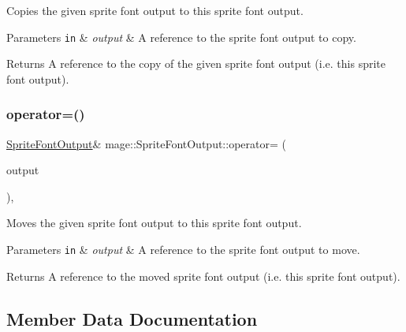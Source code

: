 Copies the given sprite font output to this sprite font output.


\begin{DoxyParams}[1]{Parameters}
\mbox{\tt in}  & {\em output} & A reference to the sprite font output to copy. \\
\hline
\end{DoxyParams}
\begin{DoxyReturn}{Returns}
A reference to the copy of the given sprite font output (i.\+e. this sprite font output). 
\end{DoxyReturn}
\hypertarget{structmage_1_1_sprite_font_output_a5311924679dbfeaf297a6c542f436886}{}\label{structmage_1_1_sprite_font_output_a5311924679dbfeaf297a6c542f436886} 
\subsubsection{\texorpdfstring{operator=()}{operator=()}\hspace{0.1cm}{\footnotesize\ttfamily [2/2]}}
{\footnotesize\ttfamily \hyperlink{structmage_1_1_sprite_font_output}{Sprite\+Font\+Output}\& mage\+::\+Sprite\+Font\+Output\+::operator= (\begin{DoxyParamCaption}\item[{\hyperlink{structmage_1_1_sprite_font_output}{Sprite\+Font\+Output} \&\&}]{output }\end{DoxyParamCaption})\hspace{0.3cm}{\ttfamily [default]}, {\ttfamily [noexcept]}}

Moves the given sprite font output to this sprite font output.


\begin{DoxyParams}[1]{Parameters}
\mbox{\tt in}  & {\em output} & A reference to the sprite font output to move. \\
\hline
\end{DoxyParams}
\begin{DoxyReturn}{Returns}
A reference to the moved sprite font output (i.\+e. this sprite font output). 
\end{DoxyReturn}


\subsection{Member Data Documentation}
\hypertarget{structmage_1_1_sprite_font_output_a137cca7a8a91c623272b345e9931ca80}{}\label{structmage_1_1_sprite_font_output_a137cca7a8a91c623272b345e9931ca80} 
